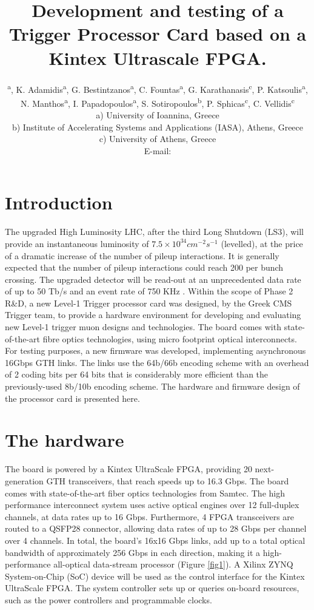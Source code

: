 \documentclass[a4paper]{PoS}
\title{Development and testing of a Trigger Processor Card based on a Kintex Ultrascale FPGA.}
\author{\speaker{S. Mallios}\textsuperscript{ a}, K. Adamidis\textsuperscript{a}, G. Bestintzanos\textsuperscript{a}, C. Fountas\textsuperscript{a}, G. Karathanasis\textsuperscript{c}, P. Katsoulis\textsuperscript{a}, N. Manthos\textsuperscript{a}, I. Papadopoulos\textsuperscript{a}, S. Sotiropoulos\textsuperscript{b}, P. Sphicas\textsuperscript{c}, C. Vellidis\textsuperscript{c}\\
\llap a) University of Ioannina, Greece\\
\llap b) Institute of Accelerating Systems and Applications (IASA), Athens, Greece\\
\llap c) University of Athens, Greece\\
E-mail: \email{stavros.mallios@cern.ch@mail.org}}
\begin{document}


\section{Introduction}
The upgraded High Luminosity LHC, after the third Long Shutdown (LS3), will provide an instantaneous luminosity of $7.5 \times 10^{34} cm^{-2} s^{-1}$ (levelled), at the price of a dramatic increase of the number of pileup interactions. It is generally expected that the number of pileup interactions could reach 200 per bunch crossing. The upgraded detector will be read-out at an unprecedented data rate of up to 50 Tb/s and an event rate of 750 KHz \cite{Collaboration:2283192}. Within the scope of Phase 2 R\&D, a new Level-1 Trigger processor card was designed, by the Greek CMS Trigger team, to provide a hardware environment for developing and evaluating new Level-1 trigger muon designs and technologies. The board comes with state-of-the-art fibre optics technologies, using micro footprint optical interconnects. For testing purposes, a new firmware was developed, implementing asynchronous 16Gbps GTH links. The links use the 64b/66b encoding scheme with an overhead of 2 coding bits per 64 bits that is considerably more efficient than the previously-used 8b/10b encoding scheme. The hardware and firmware design of the processor card is presented here.

\section{The hardware}
The board is powered by a Kintex UltraScale FPGA, providing 20 next-generation GTH transceivers, that reach speeds up to 16.3 Gbps. The board comes with state-of-the-art fiber optics technologies from Samtec. The high performance interconnect system uses active optical engines over 12 full-duplex channels, at data rates up to 16 Gbps. Furthermore, 4 FPGA transceivers are routed to a QSFP28 connector, allowing data rates of up to 28 Gbps per channel over 4 channels. In total, the board's 16x16 Gbps links, add up to a total optical bandwidth of approximately 256 Gbps in each direction, making it a high-performance all-optical data-stream processor (Figure \ref{fig1}). A Xilinx ZYNQ System-on-Chip (SoC) device will be used as the control interface for the Kintex UltraScale FPGA. The system controller sets up or queries on-board resources, such as the power controllers and programmable clocks.
\end{document}
